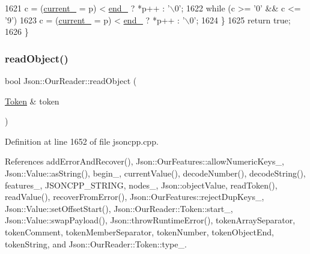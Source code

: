 \begin{DoxyCode}
1621       c = (\hyperlink{class_json_1_1_our_reader_a5211fbbba94be80a22dd2317c621efcc}{current\_} = p) < \hyperlink{class_json_1_1_our_reader_ab1f69b0260c27a0d2d65dc56e42c8f9d}{end\_} ? *p++ : \textcolor{charliteral}{'\(\backslash\)0'};
1622     \textcolor{keywordflow}{while} (c >= \textcolor{charliteral}{'0'} && c <= \textcolor{charliteral}{'9'})
1623       c = (\hyperlink{class_json_1_1_our_reader_a5211fbbba94be80a22dd2317c621efcc}{current\_} = p) < \hyperlink{class_json_1_1_our_reader_ab1f69b0260c27a0d2d65dc56e42c8f9d}{end\_} ? *p++ : \textcolor{charliteral}{'\(\backslash\)0'};
1624   \}
1625   \textcolor{keywordflow}{return} \textcolor{keyword}{true};
1626 \}
\end{DoxyCode}
\mbox{\label{class_json_1_1_our_reader_aea198f8101dba55099f4d8121a993530}} 
\subsubsection{\texorpdfstring{read\+Object()}{readObject()}}
{\footnotesize\ttfamily bool Json\+::\+Our\+Reader\+::read\+Object (\begin{DoxyParamCaption}\item[{\hyperlink{class_json_1_1_our_reader_1_1_token}{Token} \&}]{token }\end{DoxyParamCaption})\hspace{0.3cm}{\ttfamily [private]}}



Definition at line 1652 of file jsoncpp.\+cpp.



References add\+Error\+And\+Recover(), Json\+::\+Our\+Features\+::allow\+Numeric\+Keys\+\_\+, Json\+::\+Value\+::as\+String(), begin\+\_\+, current\+Value(), decode\+Number(), decode\+String(), features\+\_\+, J\+S\+O\+N\+C\+P\+P\+\_\+\+S\+T\+R\+I\+NG, nodes\+\_\+, Json\+::object\+Value, read\+Token(), read\+Value(), recover\+From\+Error(), Json\+::\+Our\+Features\+::reject\+Dup\+Keys\+\_\+, Json\+::\+Value\+::set\+Offset\+Start(), Json\+::\+Our\+Reader\+::\+Token\+::start\+\_\+, Json\+::\+Value\+::swap\+Payload(), Json\+::throw\+Runtime\+Error(), token\+Array\+Separator, token\+Comment, token\+Member\+Separator, token\+Number, token\+Object\+End, token\+String, and Json\+::\+Our\+Reader\+::\+Token\+::type\+\_\+.



